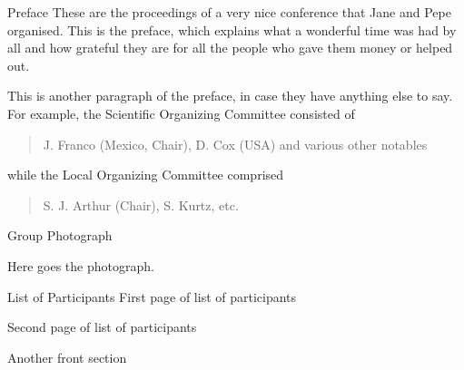 \documentclass[book,twocolumn]{rmxac}
\begin{document}
\frontmatter %

\renewcommand{\RMAAbannerimage}{rmsc_blank}
\tableofcontents

\begin{frontsection}{Preface}{%
    }
  These are the proceedings of a very nice conference that Jane and
  Pepe organised. This is the preface, which explains what a wonderful
  time was had by all and how grateful they are for all the people who
  gave them money or helped out.
  
  This is another paragraph of the preface, in case they have anything
  else to say.  For example, the Scientific Organizing Committee
  consisted of
  \begin{quote}
    J. Franco (Mexico, Chair), D. Cox (USA) and various other notables
  \end{quote}
  while the Local Organizing Committee comprised
  \begin{quote}
    S. J. Arthur (Chair), S. Kurtz, etc.
  \end{quote}

  \EditorSignature

\end{frontsection}

\begin{frontsection}[Photo]{Group Photograph}{\notitle}
\null\vfill
\centerline{Here goes the photograph.}
\vfill
\end{frontsection}

\begin{frontsection}[Participants]{List of Participants}{}
\vfil
\dotfill First page of list of participants \dotfill
\vfil\clearpage

\null\vfil
\dotfill Second page of list of participants \dotfill
\vfil

\end{frontsection}

\begin{frontsection}[XXX]{Another front section}{}

\end{frontsection}
\end{document}

